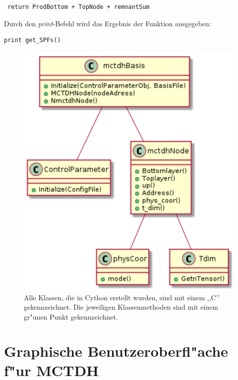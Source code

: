 \begin{verbatim}
 return ProdBottom + TopNode + remnantSum
\end{verbatim}

Durch den \textit{print}-Befehl wird das Ergebnis der Funktion ausgegeben:

\begin{verbatim}
print get_SPFs()
\end{verbatim}
    
\begin{figure}
    \centering
    \includegraphics[scale=0.6]{figures/sequenceDiagram}
    \caption{Alle Klassen, die in Cython erstellt wurden, sind mit einem ,,C'' gekennzeichnet. Die jeweiligen Klassenmethoden sind mit einem
    gr"unen Punkt gekennzeichnet.}\label{fig:uml_Cython}
\end{figure}








\section{Graphische Benutzeroberfl"ache f"ur MCTDH}

